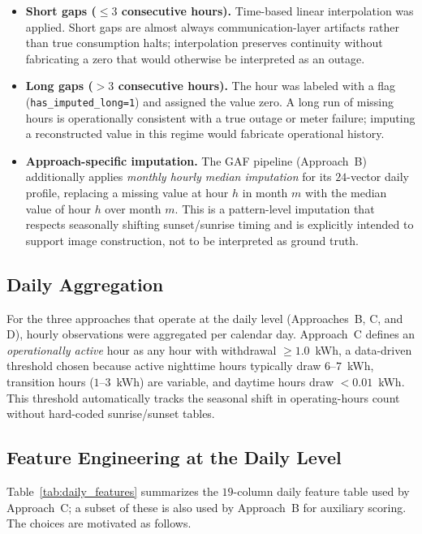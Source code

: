 \documentclass[11pt]{article}
\begin{document}
\begin{itemize}[leftmargin=1.5em,itemsep=1pt]
  \item \textbf{Short gaps ($\leq 3$ consecutive hours).} Time-based linear interpolation was applied. Short gaps are almost always communication-layer artifacts rather than true consumption halts; interpolation preserves continuity without fabricating a zero that would otherwise be interpreted as an outage.
  \item \textbf{Long gaps ($>3$ consecutive hours).} The hour was labeled with a flag (\texttt{has\_imputed\_long=1}) and assigned the value zero. A long run of missing hours is operationally consistent with a true outage or meter failure; imputing a reconstructed value in this regime would fabricate operational history.
  \item \textbf{Approach-specific imputation.} The GAF pipeline (Approach~B) additionally applies \emph{monthly hourly median imputation} for its $24$-vector daily profile, replacing a missing value at hour $h$ in month $m$ with the median value of hour $h$ over month $m$. This is a pattern-level imputation that respects seasonally shifting sunset/sunrise timing and is explicitly intended to support image construction, not to be interpreted as ground truth.
\end{itemize}

\subsection{Daily Aggregation}
For the three approaches that operate at the daily level (Approaches~B, C, and D), hourly observations were aggregated per calendar day. Approach~C defines an \emph{operationally active} hour as any hour with withdrawal $\geq 1.0$~kWh, a data-driven threshold chosen because active nighttime hours typically draw $6$--$7$~kWh, transition hours ($1$--$3$~kWh) are variable, and daytime hours draw $<0.01$~kWh. This threshold automatically tracks the seasonal shift in operating-hours count without hard-coded sunrise/sunset tables.

\subsection{Feature Engineering at the Daily Level}
Table~\ref{tab:daily_features} summarizes the $19$-column daily feature table used by Approach~C; a subset of these is also used by Approach~B for auxiliary scoring. The choices are motivated as follows.
\end{document}
